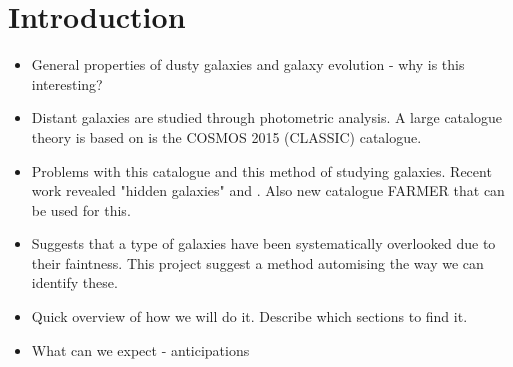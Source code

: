 \section{Introduction}
\begin{itemize}
    \item General properties of dusty galaxies and galaxy evolution - why is this interesting?
    \item Distant galaxies are studied through photometric analysis. A large catalogue theory is based on is the COSMOS 2015 (CLASSIC) catalogue.
    \item Problems with this catalogue and this method of studying galaxies. Recent work revealed "hidden galaxies" \cite{Wang_2019} and \cite{Alcalde_Pampliega_2019}. Also new catalogue FARMER that can be used for this.
    \item Suggests that a type of galaxies have been systematically overlooked due to their faintness. This project suggest a method automising the way we can identify these.
    \item Quick overview of how we will do it. Describe which sections to find it.
    \item What can we expect - anticipations
\end{itemize}


